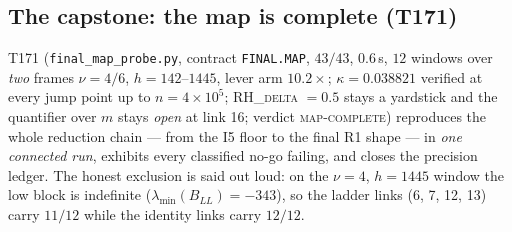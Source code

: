 \documentclass[11pt,a4paper]{article}
\begin{document}
\subsection{The capstone: the map is complete (T171)}\label{sec:t171}
T171 (\texttt{final\_map\_probe.py}, contract \texttt{FINAL.MAP},
$43/43$, $0.6$\,s, $12$ windows over \emph{two} frames $\nu=4/6$,
$h=142$--$1445$, lever arm $10.2\times$; $\kappa=0.038821$ verified at
every jump point up to $n=4\times10^{5}$; \textsc{RH\_delta} $=0.5$ stays
a yardstick and the quantifier over $m$ stays \emph{open} at link 16;
verdict \textsc{map-complete}) reproduces the whole reduction chain ---
from the I5 floor to the final R1 shape --- in \emph{one connected run},
exhibits every classified no-go failing, and closes the precision
ledger. The honest exclusion is said out loud: on the $\nu=4$, $h=1445$
window the low block is indefinite ($\lambda_{\min}(B_{LL})=-343$), so
the ladder links (6, 7, 12, 13) carry $11/12$ while the identity links
carry $12/12$.
\end{document}
